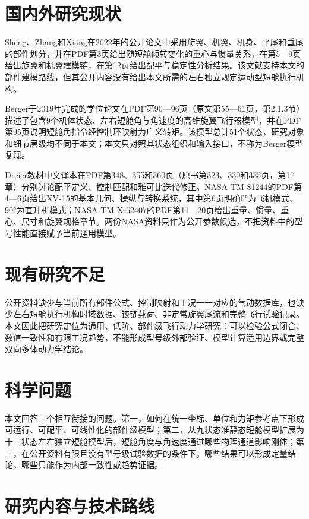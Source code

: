 \documentclass[UTF8,12pt,oneside,openany,fontset=windows]{ctexbook}
\begin{document}
\section{国内外研究现状}

Sheng、Zhang和Xiang在2022年的公开论文中采用旋翼、机翼、机身、平尾和垂尾的部件划分，并在PDF第3页给出随短舱倾转变化的重心与惯量关系，在第5—9页给出旋翼和机翼建模链，在第12页给出配平与稳定性分析结果。该文献支持本文的部件建模路线，但其公开内容没有给出本文所需的左右独立规定运动型短舱执行机构。

Berger于2019年完成的学位论文在PDF第90—96页（原文第55—61页，第2.1.3节）描述了包含9个机体状态、左右短舱角与角速度的高维旋翼飞行器模型，并在PDF第95页说明短舱角指令经控制环映射为广义转矩。该模型总计51个状态，研究对象和细节层级均不同于本文；本文只对照其状态组织和输入接口，不称为Berger模型复现。

Dreier教材中文译本在PDF第348、355和360页（原书第323、330和335页，第17章）分别讨论配平定义、控制匹配和雅可比迭代修正。NASA-TM-81244的PDF第4—6页给出XV-15的基本几何、操纵与转换系统，其中第6页明确0°为飞机模式、90°为直升机模式；NASA-TM-X-62407的PDF第11—20页给出重量、惯量、重心、尺寸和旋翼规格章节。两份NASA资料只作为公开参数候选，不把资料中的型号性能直接赋予当前通用模型。

\section{现有研究不足}

公开资料缺少与当前所有部件公式、控制映射和工况一一对应的气动数据库，也缺少左右短舱执行机构时域数据、铰链载荷、非定常旋翼尾流和完整飞行试验记录。本文因此把研究定位为通用、低阶、部件级飞行动力学研究：可以检验公式闭合、数值一致性和有限工况趋势，不能形成型号级外部验证、模型计算适用边界或完整双向多体动力学结论。

\section{科学问题}

本文回答三个相互衔接的问题。第一，如何在统一坐标、单位和力矩参考点下形成可运行、可配平、可线性化的部件级模型；第二，从九状态准静态短舱模型扩展为十三状态左右独立短舱模型后，短舱角度与角速度通过哪些物理通道影响刚体；第三，在公开资料有限且没有型号级试验数据的条件下，哪些结果可以形成定量结论，哪些只能作为内部一致性或趋势证据。

\section{研究内容与技术路线}
\end{document}
